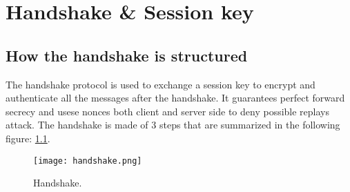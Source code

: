 
\chapter{Handshake \& Session key}
\label{cap:handshake-session-key}

\section{How the handshake is structured}

The handshake protocol is used to exchange a session key to encrypt and authenticate all the messages after the handshake. It guarantees perfect forward secrecy and usese nonces both client and server side to deny possible replays attack. The handshake is made of 3 steps that are summarized in the following figure: \ref{fig:handshake}.

\begin{figure}[!h] 
    \centering 
    \texttt{[image: handshake.png]} 
    \caption{Handshake.}
    \label{fig:handshake}
\end{figure}

